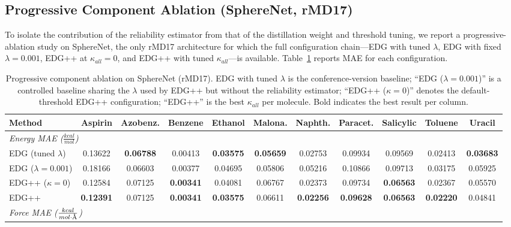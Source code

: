 \subsection{Progressive Component Ablation (SphereNet, rMD17)}
\label{app:progressive}

To isolate the contribution of the reliability estimator from that of the distillation weight and threshold tuning, we report a progressive-ablation study on SphereNet, the only rMD17 architecture for which the full configuration chain---EDG with tuned $\lambda$, EDG with fixed $\lambda\!=\!0.001$, EDG++ at $\kappa_{all}\!=\!0$, and EDG++ with tuned $\kappa_{all}$---is available. Table~\ref{tab:rmd17_progressive} reports MAE for each configuration.

\begin{table}[!htb]
  \scriptsize
  \centering
  \caption{Progressive component ablation on SphereNet (rMD17). EDG with tuned $\lambda$ is the conference-version baseline; ``EDG ($\lambda\!=\!0.001$)'' is a controlled baseline sharing the $\lambda$ used by EDG++ but without the reliability estimator; ``EDG++ ($\kappa\!=\!0$)'' denotes the default-threshold EDG++ configuration; ``EDG++'' is the best $\kappa_{all}$ per molecule. Bold indicates the best result per column.}
  \label{tab:rmd17_progressive}
  \setlength{\tabcolsep}{4pt}
    \begin{tabular}{lcccccccccc}
    \toprule
    \textbf{Method} & Aspirin & Azobenz. & Benzene & Ethanol & Malona. & Naphth. & Paracet. & Salicylic & Toluene & Uracil \\
    \midrule
    \multicolumn{11}{l}{\textit{Energy MAE ($\frac{kcal}{mol}$)}} \\
    EDG (tuned $\lambda$) & 0.13622 & \textbf{0.06788} & 0.00413 & \textbf{0.03575} & \textbf{0.05659} & 0.02753 & 0.09934 & 0.09569 & 0.02413 & \textbf{0.03683} \\
    EDG ($\lambda\!=\!0.001$) & 0.18166 & 0.06603 & 0.00377 & 0.04695 & 0.05806 & 0.05216 & 0.10866 & 0.09713 & 0.03175 & 0.05925 \\
    EDG++ ($\kappa\!=\!0$) & 0.12584 & 0.07125 & \textbf{0.00341} & 0.04081 & 0.06767 & 0.02373 & 0.09734 & \textbf{0.06563} & 0.02367 & 0.05570 \\
    EDG++ & \textbf{0.12391} & 0.07125 & \textbf{0.00341} & \textbf{0.03575} & 0.06611 & \textbf{0.02256} & \textbf{0.09628} & \textbf{0.06563} & \textbf{0.02220} & 0.04841 \\
    \midrule
    \multicolumn{11}{l}{\textit{Force MAE ($\frac{kcal}{mol\cdot \text{\r{A}}}$)}} \\

\end{tabular}
\end{table}
